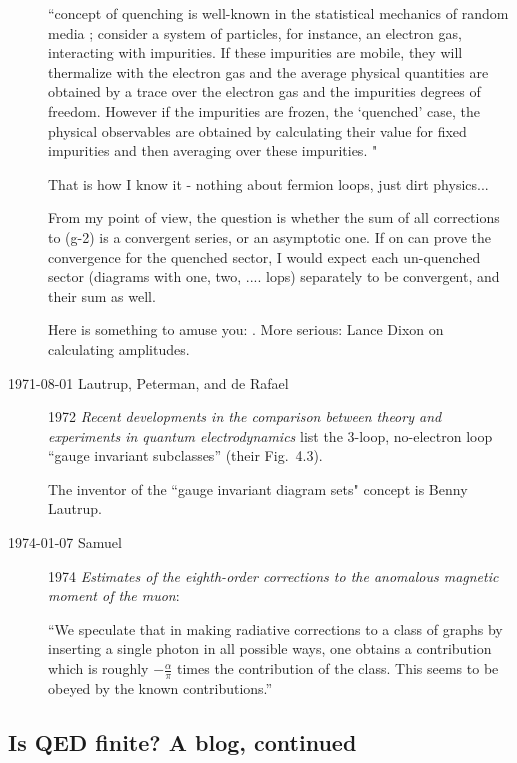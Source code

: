 \begin{description}
``concept of quenching is well-known in the statistical mechanics of
random media ; consider a system of particles, for instance, an electron
gas, interacting with impurities. If these impurities are mobile, they
will thermalize with the electron gas and the average physical quantities
are obtained by a trace over the electron gas and the impurities degrees
of freedom. However if the impurities are frozen, the `quenched' case,
the physical observables are obtained by calculating their value for
fixed impurities and then averaging over these
impurities. "

That is how I know it - nothing about fermion loops, just dirt physics...

From my point of view, the question is whether the sum of all
corrections to (g-2) is a convergent series, or an asymptotic one.
If on can prove the convergence for the quenched sector, I would
expect each un-quenched sector (diagrams with one, two, .... lops)
separately to be convergent, and their sum as well.

Here is something to amuse you:
.
More serious: Lance Dixon
{on calculating amplitudes}.

\item[1971-08-01 Lautrup, Peterman, and de Rafael]
 1972 {\em Recent
developments in the comparison between theory and experiments in quantum
electrodynamics} list the 3-loop, no-electron loop ``gauge invariant
subclasses'' (their Fig.~4.3).

The inventor of the ``gauge invariant diagram sets" concept is Benny
Lautrup.

\item[1974-01-07 Samuel]
1974 {\em Estimates of the eighth-order corrections
to the anomalous magnetic moment of the muon}:

``We speculate that in making radiative corrections to a class of graphs
by inserting a single photon in all possible ways, one obtains a
contribution which is roughly $-\frac{\alpha}{\pi}$ times the
contribution of the class. This seems to be obeyed by the known
contributions.''

\end{description}

\subsection{Is QED finite? A blog, continued}
\label{sect:finiteBlog}


